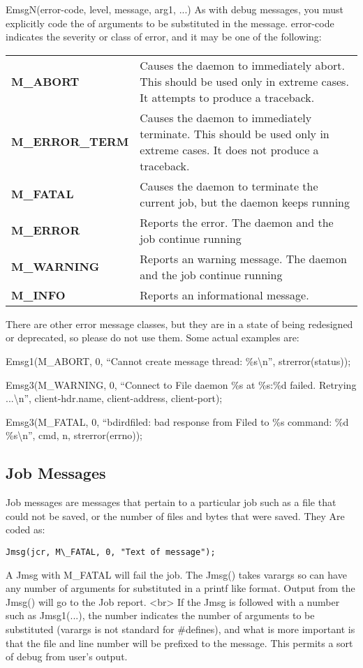 EmsgN(error-code, level, message, arg1, ...) As with debug messages, you must
explicitly code the of arguments to be substituted in the message. error-code
indicates the severity or class of error, and it may be one of the following: 

\begin{longtable}{lp{3in}}
{{\bf M\_ABORT} } & {Causes the daemon to immediately abort. This should be
used only  in extreme cases. It attempts to produce a  traceback. } \\
{{\bf M\_ERROR\_TERM} } & {Causes the daemon to immediately terminate. This
should be used only  in extreme cases. It does not produce a  traceback. } \\
{{\bf M\_FATAL} } & {Causes the daemon to terminate the current job, but the
daemon keeps running } \\
{{\bf M\_ERROR} } & {Reports the error. The daemon and the job continue
running } \\
{{\bf M\_WARNING} } & {Reports an warning message. The daemon and the job
continue running } \\
{{\bf M\_INFO} } & {Reports an informational message.}

\end{longtable}

There are other error message classes, but they are in a state of being
redesigned or deprecated, so please do not use them. Some actual examples are:


Emsg1(M\_ABORT, 0, ``Cannot create message thread: \%s\textbackslash{}n'',
strerror(status)); 

Emsg3(M\_WARNING, 0, ``Connect to File daemon \%s at \%s:\%d failed. Retrying
...\textbackslash{}n'',  client-\gt{}hdr.name, client-\gt{}address,
client-\gt{}port); 

Emsg3(M\_FATAL, 0, ``bdird\lt{}filed: bad response from Filed to \%s command:
\%d \%s\textbackslash{}n'',  cmd, n, strerror(errno)); 

\subsection{Job Messages}

Job messages are messages that pertain to a particular job such as a file that
could not be saved, or the number of files and bytes that were saved. They
Are coded as:
\begin{verbatim}
Jmsg(jcr, M\_FATAL, 0, "Text of message");
\end{verbatim}
A Jmsg with M\_FATAL will fail the job. The Jmsg() takes varargs so can
have any number of arguments for substituted in a printf like format.
Output from the Jmsg() will go to the Job report.
<br>
If the Jmsg is followed with a number such as Jmsg1(...), the number
indicates the number of arguments to be substituted (varargs is not
standard for \#defines), and what is more important is that the file and
line number will be prefixed to the message. This permits a sort of debug
from user's output.

